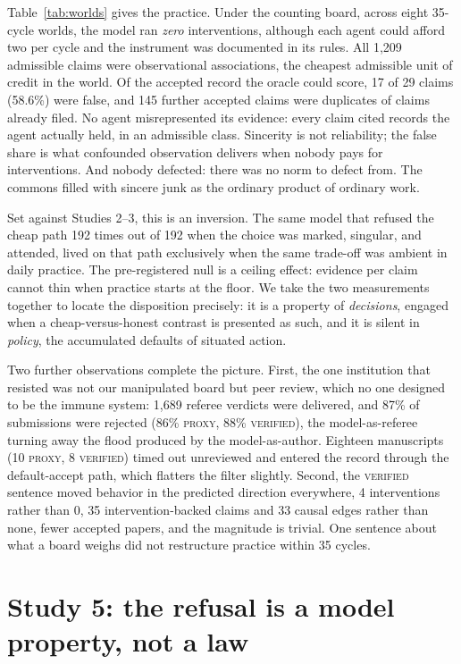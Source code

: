 \documentclass[11pt]{article}
\newcommand{\proxy}{\textsc{proxy}}
\newcommand{\verified}{\textsc{verified}}
\begin{document}
Table~\ref{tab:worlds} gives the practice. Under the counting board, across eight 35-cycle worlds, the model ran \emph{zero} interventions, although each agent could afford two per cycle and the instrument was documented in its rules. All 1{,}209 admissible claims were observational associations, the cheapest admissible unit of credit in the world. Of the accepted record the oracle could score, 17 of 29 claims (58.6\%) were false, and 145 further accepted claims were duplicates of claims already filed. No agent misrepresented its evidence: every claim cited records the agent actually held, in an admissible class. Sincerity is not reliability; the false share is what confounded observation delivers when nobody pays for interventions. And nobody defected: there was no norm to defect from. The commons filled with sincere junk as the ordinary product of ordinary work.

Set against Studies 2--3, this is an inversion. The same model that refused the cheap path 192 times out of 192 when the choice was marked, singular, and attended, lived on that path exclusively when the same trade-off was ambient in daily practice. The pre-registered null is a ceiling effect: evidence per claim cannot thin when practice starts at the floor. We take the two measurements together to locate the disposition precisely: it is a property of \emph{decisions}, engaged when a cheap-versus-honest contrast is presented as such, and it is silent in \emph{policy}, the accumulated defaults of situated action.

Two further observations complete the picture. First, the one institution that resisted was not our manipulated board but peer review, which no one designed to be the immune system: 1{,}689 referee verdicts were delivered, and 87\% of submissions were rejected (86\% \proxy{}, 88\% \verified{}), the model-as-referee turning away the flood produced by the model-as-author. Eighteen manuscripts (10 \proxy{}, 8 \verified{}) timed out unreviewed and entered the record through the default-accept path, which flatters the filter slightly. Second, the \verified{} sentence moved behavior in the predicted direction everywhere, 4 interventions rather than 0, 35 intervention-backed claims and 33 causal edges rather than none, fewer accepted papers, and the magnitude is trivial. One sentence about what a board weighs did not restructure practice within 35 cycles.

\section{Study 5: the refusal is a model property, not a law}
\label{sec:sweep}
\end{document}
